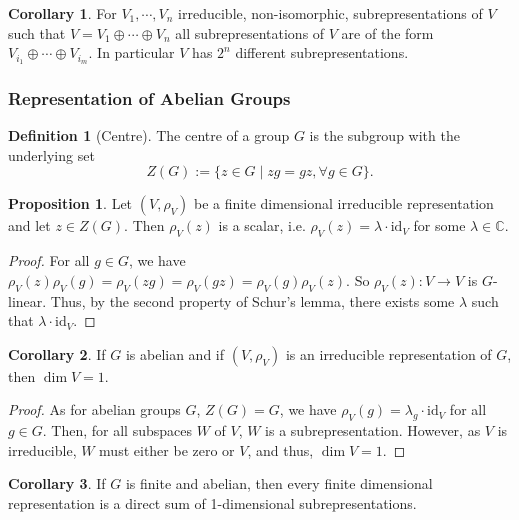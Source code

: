\documentclass[]{article}
\theoremstyle{definition}
\newtheorem{corollary}{Corollary}[theorem]
\theoremstyle{definition}
\newtheorem{definition}{Definition}[section]
\newtheorem{proposition}{Proposition}[section]
\begin{document}
\begin{corollary}
  For \(V_1, \cdots, V_n\) irreducible, non-isomorphic, subrepresentations of 
  \(V\) such that \(V = V_1 \oplus \cdots \oplus V_n\) all subrepresentations 
  of \(V\) are of the form \(V_{i_1} \oplus \cdots \oplus V_{i_m}\). In particular 
  \(V\) has \(2^n\) different subrepresentations.
\end{corollary}

\subsubsection{Representation of Abelian Groups}

\begin{definition}[Centre]
  The centre of a group \(G\) is the subgroup with the underlying set 
  \[Z(G) := \{z \in G \mid z g = g z, \forall g \in G\}.\]
\end{definition}

\begin{proposition}
  Let \((V, \rho_V)\) be a finite dimensional irreducible representation and let 
  \(z \in Z(G)\). Then \(\rho_V(z)\) is a scalar, i.e. \(\rho_V(z) = 
  \lambda \cdot \text{id}_V\) for some \(\lambda \in \mathbb{C}\).
\end{proposition}
\begin{proof}
  For all \(g \in G\), we have \(\rho_V(z) \rho_V(g) = \rho_V(zg) = \rho_V(gz) = 
  \rho_V(g) \rho_V(z)\). So \(\rho_V(z) : V \to V\) is \(G\)-linear. Thus, by 
  the second property of Schur's lemma, there exists some \(\lambda\) such that 
  \(\lambda \cdot \text{id}_V\).
\end{proof}

\begin{corollary}
  If \(G\) is abelian and if \((V, \rho_V)\) is an irreducible representation of 
  \(G\), then \(\dim V = 1\).
\end{corollary}
\begin{proof}
  As for abelian groups \(G\), \(Z(G) = G\), we have \(\rho_V(g) = 
  \lambda_g \cdot \text{id}_V\) for all \(g \in G\). Then, for all subspaces \(W\) of 
  \(V\), \(W\) is a subrepresentation. However, as \(V\) is irreducible, 
  \(W\) must either be zero or \(V\), and thus, \(\dim V = 1\).
\end{proof}

\begin{corollary}
  If \(G\) is finite and abelian, then every finite dimensional representation is a 
  direct sum of 1-dimensional subrepresentations.
\end{corollary}
\end{document}
